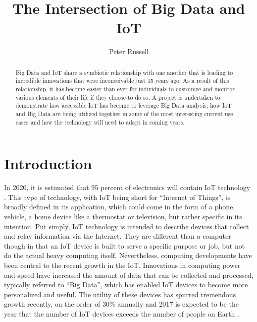 \documentclass[sigconf]{acmart}
\begin{document}
\title{The Intersection of Big Data and IoT}

\author{Peter Russell}

\begin{abstract}

Big Data and IoT share a symbiotic relationship with one another that is leading to incredible innovations that were inconceivable just 15 years ago. As a result of this relationship, it has become easier than ever for individuals to customize and monitor various elements of their life if they choose to do so. A project is undertaken to demonstrate how accessible IoT has become to leverage Big Data analysis, how IoT and Big Data are being utilized together in some of the most interesting current use cases and how the technology will need to adapt in coming years. 

\end{abstract}


\maketitle

\section{Introduction}
In 2020, it is estimated that 95 percent of electronics will contain IoT technology \cite{gartner95}. This type of technology, with IoT being short for ``Internet of Things'', is broadly defined in its application, which could come in the form of a phone, vehicle, a home device like a thermostat or television, but rather specific in its intention. Put simply, IoT technology is intended to describe devices that collect and relay information via the Internet. They are different than a computer though in that an IoT device is built to serve a specific purpose or job, but not do the actual heavy computing itself. Nevertheless, computing developments have been central to the recent growth in the IoT. Innovations in computing power and speed have increased the amount of data that can be collected and processed, typically referred to ``Big Data'', which has enabled IoT devices to become more personalized and useful. The utility of these devices has spurred tremendous growth recently, on the order of $30 \%$ annually and 2017 is expected to be the year that the number of IoT devices exceeds the number of people on Earth \cite{gartnerconnected}.
\end{document}
